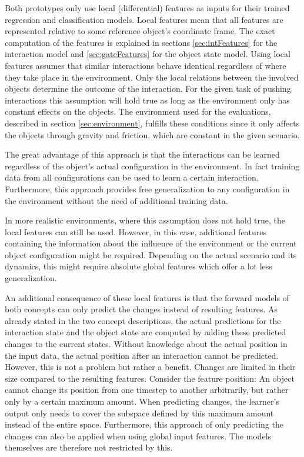 Both prototypes only use local (differential) features as inputs for their trained regression and classification models. 
Local features mean that all features are represented relative to some reference object's coordinate frame. The exact computation of the features is explained in sections \ref{sec:intFeatures} for the interaction model and \ref{sec:gateFeatures} for the object state model.
Using local features assumes that similar interactions behave identical regardless of where they take place in the environment. 
Only the local relations between the involved objects determine the outcome of the interaction. 
For the given task of pushing interactions this assumption will hold true as long as the environment only has constant effects on the objects. The environment used for the evaluations, described in section \ref{sec:environment}, fulfills these conditions since it only affects the objects through gravity and friction, which are constant in the given scenario. 

The great advantage of this approach is that the interactions can be learned regardless of the object's actual configuration in the environment. In fact training data from all configurations can be used to learn a certain interaction. Furthermore, this approach provides free generalization to any configuration in the environment without the need of additional training data.

In more realistic environments, where this assumption does not hold true, the local features can still be used. However, in this case, additional features containing the information about the influence of the environment or the current object configuration might be required. Depending on the actual scenario and its dynamics, this might require absolute global features which offer a lot less generalization.

An additional consequence of these local features is that the forward models of both concepts can only predict the changes instead of resulting features. As already stated in the two concept descriptions, the actual predictions for the interaction state and the object state are computed by adding these predicted changes to the current states.
Without knowledge about the actual position in the input data, the actual position after an interaction cannot be predicted. However, this is not a problem but rather a benefit. Changes are limited in their size compared to the resulting features. 
Consider the feature position: An object cannot change its position from one timestep to another arbitrarily, but rather only by a certain maximum amount. When predicting changes, the learner's output only needs to cover the subspace defined by this maximum amount instead of the entire space. Furthermore, this approach of only predicting the changes can also be applied when using global input features. The models themselves are therefore not restricted by this.


